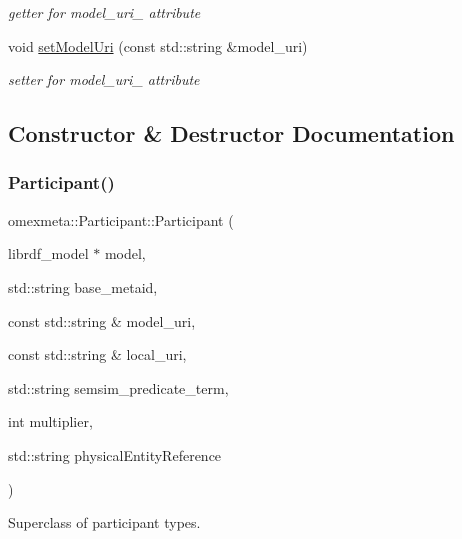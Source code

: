 \begin{DoxyCompactItemize}
\begin{DoxyCompactList}\small\item\em getter for model\+\_\+uri\+\_\+ attribute \end{DoxyCompactList}\item 
\mbox{\label{classomexmeta_1_1Participant_abea74e8605f7314a51db8dc723961462}} 
void \hyperlink{classomexmeta_1_1Participant_abea74e8605f7314a51db8dc723961462}{set\+Model\+Uri} (const std\+::string \&model\+\_\+uri)
\begin{DoxyCompactList}\small\item\em setter for model\+\_\+uri\+\_\+ attribute \end{DoxyCompactList}\end{DoxyCompactItemize}


\subsection{Constructor \& Destructor Documentation}
\mbox{\label{classomexmeta_1_1Participant_a95c8c86650d1b0d31bb47eb618ff81b9}} 
\subsubsection{\texorpdfstring{Participant()}{Participant()}}
{\footnotesize\ttfamily omexmeta\+::\+Participant\+::\+Participant (\begin{DoxyParamCaption}\item[{librdf\+\_\+model $\ast$}]{model,  }\item[{std\+::string}]{base\+\_\+metaid,  }\item[{const std\+::string \&}]{model\+\_\+uri,  }\item[{const std\+::string \&}]{local\+\_\+uri,  }\item[{std\+::string}]{semsim\+\_\+predicate\+\_\+term,  }\item[{int}]{multiplier,  }\item[{std\+::string}]{physical\+Entity\+Reference }\end{DoxyParamCaption})}



Superclass of participant types. 


